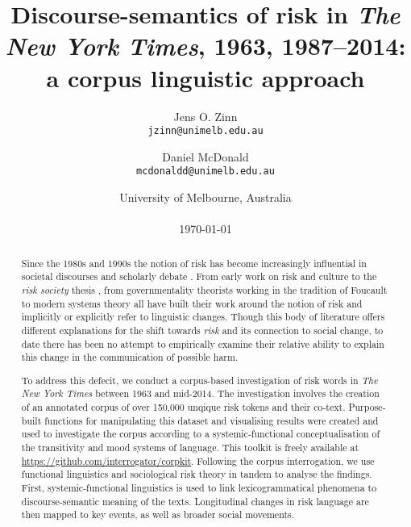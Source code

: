 \documentclass{report}
\title{Discourse-semantics of risk in \emph{The New York Times}, 1963, 1987--2014: a corpus linguistic approach}
\author{
    Jens O. Zinn\\
    \texttt{jzinn@unimelb.edu.au}
    \and
    Daniel McDonald\\
    \texttt{mcdonaldd@unimelb.edu.au}\\
    }
\date{University of Melbourne, Australia\\
    ~\\
    \today}
\begin{document}
        

    \renewcommand{\abstractname}{Abstract}

    \maketitle

\begin{abstract}

    \noindent Since the 1980s and 1990s the notion of risk has become increasingly influential in societal discourses and scholarly debate \cite{skolbekken_risk_1995}. From early work on risk and culture \cite{douglas_risk_1986,douglas_risk_2013} to the \emph{risk society} thesis \cite{beck_risk_1992,beck_world_2009,giddens_runaway_2002}, from governmentality theorists working in the tradition of Foucault \cite{dean_governmentality:_2010,omalley_risk_2012,rose_powers_1999} to modern systems theory \cite{luhmann_risk:_1993} all have built their work around the notion of risk and implicitly or explicitly refer to linguistic changes. Though this body of literature offers different explanations for the shift towards \emph{risk} and its connection to social change, to date there has been no attempt to empirically examine their relative ability to explain this change in the communication of possible harm. 


    To address this defecit, we conduct a corpus-based investigation of risk words in \emph{The New York Times} between 1963 and mid-2014. The investigation involves the creation of an annotated corpus of over 150,000 unqique risk tokens and their co-text. Purpose-built functions for manipulating this dataset and visualising results were created and used to investigate the corpus according to a systemic-functional conceptualisation of the transitivity and mood systems of language. This toolkit is freely available at \url{https://github.com/interrogator/corpkit}. Following the corpus interrogation, we use functional linguistics and sociological risk theory in tandem to analyse the findings. First, systemic-functional linguistics is used to link lexicogrammatical phenomena to discourse-semantic meaning of the texts. Longitudinal changes in risk language are then mapped to key events, as well as broader social movements.


\end{abstract}
\end{document}
